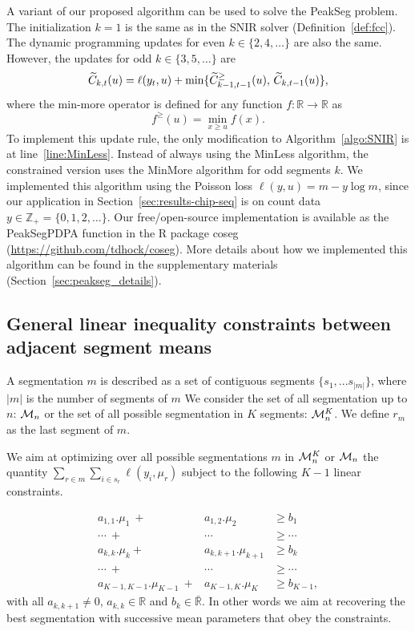 \documentclass{article}
\newcommand{\ZZ}{\mathbb Z}
\newcommand{\RR}{\mathbb R}
\begin{document}
A variant of our proposed algorithm can be used to solve the PeakSeg
problem. The initialization $k=1$ is the same as in the SNIR solver
(Definition~\ref{def:fcc}). The dynamic programming updates for even
$k\in\{2, 4, \dots\}$ are also the same. However, the updates for odd
$k\in\{3, 5, \dots\}$ are
\begin{equation}
  \widetilde{C}_{k,t}(u) = \ell(y_t, u) + \min\{
  \widetilde{C}_{k-1,t-1}^\geq(u),\, \widetilde{C}_{k,t-1}(u)
  \},
\end{equation}
where the min-more operator is defined for any function $f:\RR\rightarrow\RR$ as
\begin{equation}
  \label{eq:min-more-def}
  f^\geq(u) = \min_{x\geq u} f(x).
\end{equation}
To implement this update rule, the only modification to
Algorithm~\ref{algo:SNIR} is at line~\ref{line:MinLess}. Instead of
always using the MinLess algorithm, the constrained version uses the
MinMore algorithm for odd segments $k$. We implemented this algorithm
using the Poisson loss $\ell(y, u) = m - y\log m$, since our
application in Section~\ref{sec:results-chip-seq} is on count data
$y\in\ZZ_+ = \{0, 1, 2, \dots\}$. Our free/open-source implementation
is available as the PeakSegPDPA function in the R package coseg
(\url{https://github.com/tdhock/coseg}). More details about how we
implemented this algorithm can be found in the supplementary materials
(Section~\ref{sec:peakseg_details}).

\subsection{General linear inequality constraints
  between adjacent segment means}

A segmentation $m$ is described as a set of contiguous segments $\{s_1, ... s_{|m|} \}$, where $|m|$ is the number of segments of $m$
We consider the set of all segmentation up to $n$: $\mathcal{M}_n$ 
or the set of all possible segmentation in $K$ segments: $\mathcal{M}^K_n$.
We define $r_m$ as the last segment of $m$.

We aim at optimizing over all possible segmentations $m$ in $\mathcal{M}^K_n$ or $\mathcal{M}_n$
 the quantity
$\sum_{r \in m} \sum_{i \in s_{r}} \ell(y_i, \mu_{r})$ subject to
the following $K-1$ linear constraints. 

\begin{eqnarray*}
a_{1,1}.\mu_1 \ + & a_{1,2}.\mu_2  & \geq  b_1 \\
\cdots \ +&  \cdots & \geq \cdots \\
a_{k,k}.\mu_{k} + & a_{k,k+1}.\mu_{k+1}  & \geq  b_{k} \\
\cdots \ +&  \cdots & \geq \cdots  \\
a_{K-1,K-1}.\mu_{K-1} \ +& a_{K-1,K}.\mu_K & \geq  b_{K-1},
\end{eqnarray*}
with all $a_{k,k+1} \neq 0$, $a_{k,k} \in \mathbb{R}$ and
$b_{k} \in \bar{\mathbb{R}}.$ In other words we aim at recovering the
best segmentation with successive mean parameters that obey the
constraints.
\end{document}

